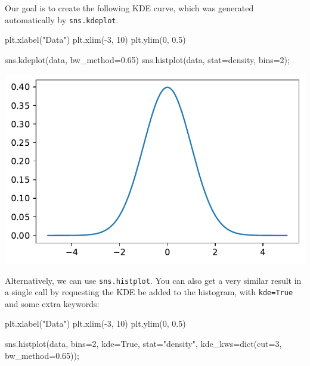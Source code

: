 \documentclass[
  letterpaper,
  DIV=11,
  numbers=noendperiod]{scrreprt}
\newenvironment{Shaded}{\begin{snugshade}}{\end{snugshade}}
\newcommand{\BuiltInTok}[1]{\textcolor[rgb]{0.00,0.23,0.31}{#1}}
\newcommand{\DecValTok}[1]{\textcolor[rgb]{0.68,0.00,0.00}{#1}}
\newcommand{\FloatTok}[1]{\textcolor[rgb]{0.68,0.00,0.00}{#1}}
\newcommand{\NormalTok}[1]{\textcolor[rgb]{0.00,0.23,0.31}{#1}}
\newcommand{\OperatorTok}[1]{\textcolor[rgb]{0.37,0.37,0.37}{#1}}
\newcommand{\StringTok}[1]{\textcolor[rgb]{0.13,0.47,0.30}{#1}}
\newcommand{\VariableTok}[1]{\textcolor[rgb]{0.07,0.07,0.07}{#1}}
\begin{document}
Our goal is to create the following KDE curve, which was generated
automatically by \texttt{sns.kdeplot}.

\begin{Shaded}
\begin{Highlighting}[]
\NormalTok{plt.xlabel(}\StringTok{"Data"}\NormalTok{)}
\NormalTok{plt.xlim(}\OperatorTok{{-}}\DecValTok{3}\NormalTok{, }\DecValTok{10}\NormalTok{)}
\NormalTok{plt.ylim(}\DecValTok{0}\NormalTok{, }\FloatTok{0.5}\NormalTok{)}

\NormalTok{sns.kdeplot(data, bw\_method}\OperatorTok{=}\FloatTok{0.65}\NormalTok{) }
\NormalTok{sns.histplot(data, stat}\OperatorTok{=}\StringTok{\textquotesingle{}density\textquotesingle{}}\NormalTok{, bins}\OperatorTok{=}\DecValTok{2}\NormalTok{)}\OperatorTok{;}
\end{Highlighting}
\end{Shaded}

\includegraphics{visualization_2/visualization_2_files/figure-pdf/cell-5-output-1.pdf}

Alternatively, we can use \texttt{sns.histplot}. You can also get a very
similar result in a single call by requesting the KDE be added to the
histogram, with \texttt{kde=True} and some extra keywords:

\begin{Shaded}
\begin{Highlighting}[]
\NormalTok{plt.xlabel(}\StringTok{"Data"}\NormalTok{)}
\NormalTok{plt.xlim(}\OperatorTok{{-}}\DecValTok{3}\NormalTok{, }\DecValTok{10}\NormalTok{)}
\NormalTok{plt.ylim(}\DecValTok{0}\NormalTok{, }\FloatTok{0.5}\NormalTok{)}

\NormalTok{sns.histplot(data, bins}\OperatorTok{=}\DecValTok{2}\NormalTok{, kde}\OperatorTok{=}\VariableTok{True}\NormalTok{, stat}\OperatorTok{=}\StringTok{"density"}\NormalTok{, kde\_kws}\OperatorTok{=}\BuiltInTok{dict}\NormalTok{(cut}\OperatorTok{=}\DecValTok{3}\NormalTok{, bw\_method}\OperatorTok{=}\FloatTok{0.65}\NormalTok{))}\OperatorTok{;}
\end{Highlighting}
\end{Shaded}
\end{document}
